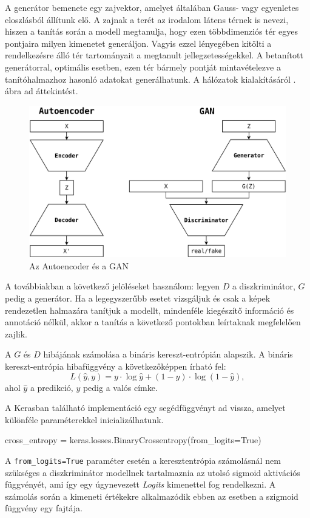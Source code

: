 A generátor bemenete egy zajvektor, amelyet általában Gauss- vagy egyenletes eloszlásból állítunk elő. A zajnak a terét az irodalom látens térnek is nevezi, hiszen a tanítás során a modell megtanulja, hogy ezen többdimenziós tér egyes pontjaira milyen kimenetet generáljon. Vagyis ezzel lényegében kitölti a rendelkezésre álló tér tartományait a megtanult jellegzetességekkel. A betanított generátorral, optimális esetben, ezen tér bármely pontját mintavételezve a tanítóhalmazhoz hasonló adatokat generálhatunk. A hálózatok kialakításáról . ábra ad áttekintést.

\begin{figure}[h]
\centering
\includegraphics[width=12cm]{images/AEvsGAN.png}
\caption{Az Autoencoder és a GAN}
\label{fig:aevsgan}
\end{figure}


A továbbiakban a következő jelöléseket használom: legyen $D$ a diszkriminátor, $G$ pedig a generátor.
Ha a legegyszerűbb esetet vizsgáljuk és csak a képek rendezetlen halmazára tanítjuk a modellt, mindenféle kiegészítő információ és annotáció nélkül, akkor a tanítás a következő pontokban leírtaknak megfelelően zajlik.


A $G$ és $D$ hibájának számolása a bináris kereszt-entrópián alapszik.
A bináris kereszt-entrópia hibafüggvény a következőképpen írható fel:
$$L(\hat y, y) = y \cdot \log \hat y + (1-y) \cdot \log (1 - \hat y),$$
ahol $\hat y$ a predikció, $y$ pedig a valós címke.

A Kerasban található implementáció egy segédfüggvényt ad vissza, amelyet különféle paraméterekkel inicializálhatunk.
\begin{python}
cross_entropy = keras.losses.BinaryCrossentropy(from_logits=True)
\end{python}
A \texttt{from\_logits=True} paraméter esetén a keresztentrópia számolásnál nem szükséges a diszkriminátor modellnek tartalmaznia az utolsó sigmoid aktivációs függvényét, ami így egy úgynevezett \textit{Logits} kimenettel fog rendelkezni. A számolás során a kimeneti értékekre alkalmazódik ebben az esetben a szigmoid függvény egy fajtája.

